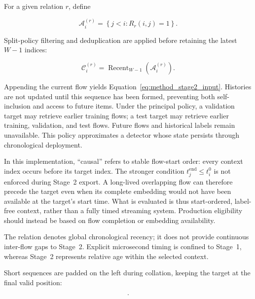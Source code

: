\documentclass[11pt,fleqn]{report}
\begin{document}
For a given relation $r$, define

\begin{equation}
    \mathcal{A}^{(r)}_i
    =\left\{j<i:R_r(i,j)=1\right\}.
    \label{eq:method_eligible_context}
\end{equation}

Split-policy filtering and deduplication are applied before retaining the latest $W-1$ indices:

\begin{equation}
    \mathcal{C}^{(r)}_i
    =\operatorname{Recent}_{W-1}
      \left(\mathcal{A}^{(r)}_i\right).
    \label{eq:recent_context}
\end{equation}

Appending the current flow yields Equation~\ref{eq:method_stage2_input}. Histories are not updated until this sequence has been formed, preventing both self-inclusion and access to future items. Under the principal  policy, a validation target may retrieve earlier training flows; a test target may retrieve earlier training, validation, and test flows. Future flows and historical labels remain unavailable. This policy approximates a detector whose state persists through chronological deployment.

In this implementation, ``causal'' refers to stable flow-start order: every context index occurs before its target index. The stronger condition $t_j^{\mathrm{end}}\leq t_i^{0}$ is not enforced during Stage~2 export. A long-lived overlapping flow can therefore precede the target even when its complete embedding would not have been available at the target's start time. What is evaluated is thus start-ordered, label-free context, rather than a fully timed streaming system. Production eligibility should instead be based on flow completion or embedding availability.

The  relation denotes global chronological recency; it does not provide continuous inter-flow gaps to Stage~2. Explicit microsecond timing is confined to Stage~1, whereas Stage~2 represents relative age within the selected context.

Short sequences are padded on the left during collation, keeping the target at the final valid position:

\begin{equation}
    [\mathrm{PAD},\ldots,\mathrm{PAD},
      \mathbf{z}^{(1)}_{j_1},\ldots,
      \mathbf{z}^{(1)}_{j_{K_i}},
      \mathbf{z}^{(1)}_i].
    \label{eq:left_padded_context}
\end{equation}
\end{document}

